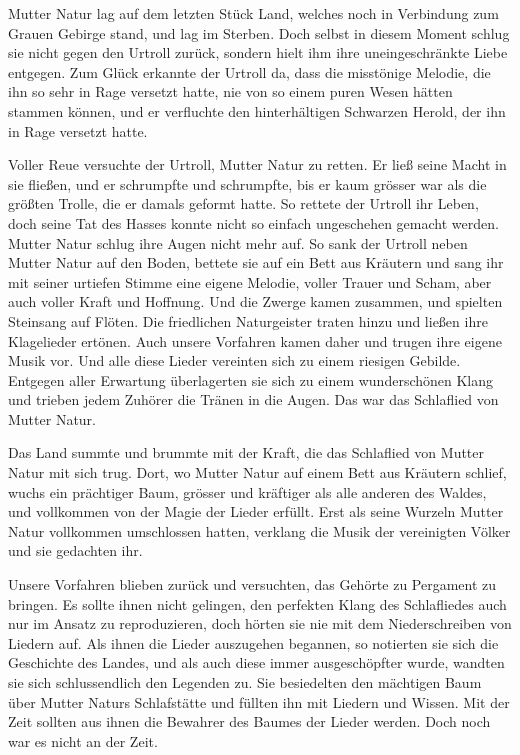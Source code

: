 Mutter Natur lag auf dem letzten Stück Land, welches noch in Verbindung zum Grauen Gebirge stand, und lag im Sterben. Doch selbst in diesem Moment schlug sie nicht gegen den Urtroll zurück, sondern hielt ihm ihre uneingeschränkte Liebe entgegen. Zum Glück erkannte der Urtroll da, dass die misstönige Melodie, die ihn so sehr in Rage versetzt hatte, nie von so einem puren Wesen hätten stammen können, und er verfluchte den hinterhältigen Schwarzen Herold, der ihn in Rage versetzt hatte.

Voller Reue versuchte der Urtroll, Mutter Natur zu retten. Er ließ seine Macht in sie fließen, und er schrumpfte und schrumpfte, bis er kaum grösser war als die größten Trolle, die er damals geformt hatte. So rettete der Urtroll ihr Leben, doch seine Tat des Hasses konnte nicht so einfach ungeschehen gemacht werden. Mutter Natur schlug ihre Augen nicht mehr auf. So sank der Urtroll neben Mutter Natur auf den Boden, bettete sie auf ein Bett aus Kräutern und sang ihr mit seiner urtiefen Stimme eine eigene Melodie, voller Trauer und Scham, aber auch voller Kraft und Hoffnung. Und die Zwerge kamen zusammen, und spielten Steinsang auf Flöten. Die friedlichen Naturgeister traten hinzu und ließen ihre Klagelieder ertönen. Auch unsere Vorfahren kamen daher und trugen ihre eigene Musik vor. Und alle diese Lieder vereinten sich zu einem riesigen Gebilde. Entgegen aller Erwartung überlagerten sie sich zu einem wunderschönen Klang und trieben jedem Zuhörer die Tränen in die Augen. Das war das Schlaflied von Mutter Natur.

Das Land summte und brummte mit der Kraft, die das Schlaflied von Mutter Natur mit sich trug. Dort, wo Mutter Natur auf einem Bett aus Kräutern schlief, wuchs ein prächtiger Baum, grösser und kräftiger als alle anderen des Waldes, und vollkommen von der Magie der Lieder erfüllt. Erst als seine Wurzeln Mutter Natur vollkommen umschlossen hatten, verklang die Musik der vereinigten Völker und sie gedachten ihr.

Unsere Vorfahren blieben zurück und versuchten, das Gehörte zu Pergament zu bringen. Es sollte ihnen nicht gelingen, den perfekten Klang des Schlafliedes auch nur im Ansatz zu reproduzieren, doch hörten sie nie mit dem Niederschreiben von Liedern auf. Als ihnen die Lieder auszugehen begannen, so notierten sie sich die Geschichte des Landes, und als auch diese immer ausgeschöpfter wurde, wandten sie sich schlussendlich den Legenden zu. Sie besiedelten den mächtigen Baum über Mutter Naturs Schlafstätte und füllten ihn mit Liedern und Wissen. Mit der Zeit sollten aus ihnen die Bewahrer des Baumes der Lieder werden. Doch noch war es nicht an der Zeit.

